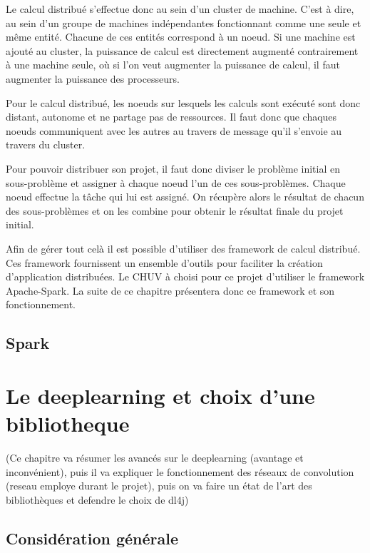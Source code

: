 \documentclass[a4paper,10pt,openany,oneside]{sphinxmanual}
\begin{document}
Le calcul distribué s'effectue donc au sein d'un cluster de machine. C'est à dire, au sein d'un groupe de machines indépendantes fonctionnant
comme une seule et même entité. Chacune de ces entités correspond à un noeud. Si une machine est ajouté au cluster, la puissance de calcul est
directement augmenté contrairement à une machine seule, où si l'on veut augmenter la puissance de calcul, il faut augmenter la puissance des
processeurs.

Pour le calcul distribué, les noeuds sur lesquels les calculs sont exécuté sont donc distant, autonome et ne partage pas de ressources. Il
faut donc que chaques noeuds communiquent avec les autres au travers de message qu'il s'envoie au travers du cluster.

Pour pouvoir distribuer son projet, il faut donc diviser le problème initial en sous-problème et assigner à chaque noeud l'un de ces sous-problèmes.
Chaque noeud effectue la tâche qui lui est assigné. On récupère alors le résultat de chacun des sous-problèmes et on les combine pour obtenir le
résultat finale du projet initial.

Afin de gérer tout celà il est possible d'utiliser des framework de calcul distribué. Ces framework fournissent un ensemble d'outils pour faciliter
la création d'application distribuées. Le CHUV à choisi pour ce projet d'utiliser le framework Apache-Spark. La suite de ce chapitre présentera donc
ce framework et son fonctionnement.


\subsection{Spark}
\label{index:spark}

\section{Le deeplearning et choix d'une bibliotheque}
\label{index:le-deeplearning-et-choix-d-une-bibliotheque}
(Ce chapitre va résumer les avancés sur le deeplearning (avantage et inconvénient),
puis il va expliquer le fonctionnement des réseaux de convolution (reseau employe durant le projet),
puis on va faire un état
de l'art des bibliothèques et defendre le choix de dl4j)


\subsection{Considération générale}
\label{index:consideration-generale}
\end{document}
